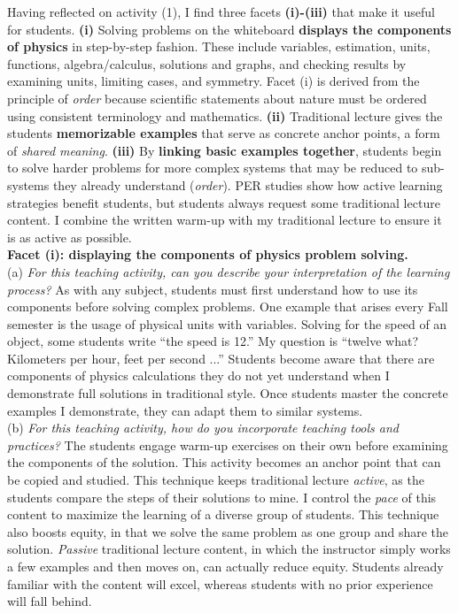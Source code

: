 \documentclass[../../../main.tex]{subfiles}
\begin{document}
Having reflected on activity (1), I find three facets \textbf{(i)-(iii)} that make it useful for students. \textbf{(i)} Solving problems on the whiteboard \textbf{displays the components of physics} in step-by-step fashion.  These include variables, estimation, units, functions, algebra/calculus, solutions and graphs, and checking results by examining units, limiting cases, and symmetry.  Facet (i) is derived from the principle of \textit{order} because scientific statements about nature must be ordered using consistent terminology and mathematics. \textbf{(ii)} Traditional lecture gives the students \textbf{memorizable examples} that serve as concrete anchor points, a form of \textit{shared meaning}.  \textbf{(iii)} By \textbf{linking basic examples together}, students begin to solve harder problems for more complex systems that may be reduced to sub-systems they already understand (\textit{order}).  PER studies show how active learning strategies benefit students, but students always request some traditional lecture content.  I combine the written warm-up with my traditional lecture to ensure it is as active as possible.
\\
\vspace{0.25cm}
\textbf{Facet (i): displaying the components of physics problem solving.}
\\
\vspace{0.25cm}
(a) \textit{For this teaching activity, can you describe your interpretation of the learning process?}  As with any subject, students must first understand how to use its components before solving complex problems.  One example that arises every Fall semester is the usage of physical units with variables.  Solving for the speed of an object, some students write ``the speed is 12.''  My question is ``twelve what? Kilometers per hour, feet per second ...'' Students become aware that there are components of physics calculations they do not yet understand when I demonstrate full solutions in traditional style.  Once students master the concrete examples I demonstrate, they can adapt them to similar systems.
\\
\vspace{0.25cm}
(b) \textit{For this teaching activity, how do you incorporate teaching tools and practices?}  The students engage warm-up exercises on their own before examining the components of the solution.  This activity becomes an anchor point that can be copied and studied.  This technique keeps traditional lecture \textit{active}, as the students compare the steps of their solutions to mine.  I control the \textit{pace} of this content to maximize the learning of a diverse group of students.  This technique also boosts equity, in that we solve the same problem as one group and share the solution.  \textit{Passive} traditional lecture content, in which the instructor simply works a few examples and then moves on, can actually reduce equity.  Students already familiar with the content will excel, whereas students with no prior experience will fall behind.
\end{document}
